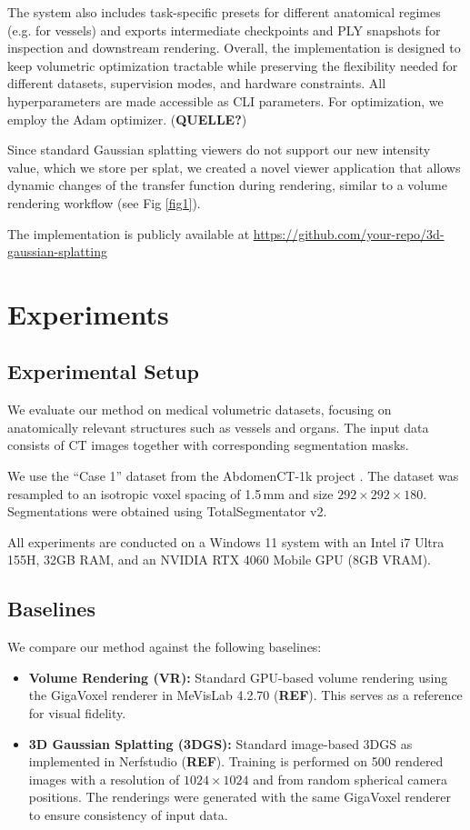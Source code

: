 \documentclass[runningheads]{llncs}
\begin{document}
The system also includes task-specific presets for different anatomical regimes (e.g. for vessels) and exports intermediate checkpoints and PLY snapshots for inspection and downstream rendering. Overall, the implementation is designed to keep volumetric optimization tractable while preserving the flexibility needed for different datasets, supervision modes, and hardware constraints. All hyperparameters are made accessible as CLI parameters. For optimization, we employ the Adam optimizer. (\textbf{QUELLE?})

Since standard Gaussian splatting viewers do not support our new intensity value, which we store per splat, we created a novel viewer application that allows dynamic changes of the transfer function during rendering, similar to a volume rendering workflow (see Fig \ref{fig1}).

The implementation is publicly available at \url{https://github.com/your-repo/3d-gaussian-splatting}



\section{Experiments}

\subsection{Experimental Setup}
We evaluate our method on medical volumetric datasets, focusing on anatomically relevant structures such as vessels and organs. The input data consists of CT images together with corresponding segmentation masks.

We use the ``Case 1'' dataset from the AbdomenCT-1k project \cite{ma2021abdomenct}. The dataset was resampled to an isotropic voxel spacing of 1.5\,mm and size $292 \times 292 \times 180$. Segmentations were obtained using TotalSegmentator v2.

All experiments are conducted on a Windows 11 system with an Intel i7 Ultra 155H, 32GB RAM, and an NVIDIA RTX 4060 Mobile GPU (8GB VRAM).

\subsection{Baselines}
We compare our method against the following baselines:

\begin{itemize}
\item \textbf{Volume Rendering (VR):} Standard GPU-based volume rendering using the GigaVoxel renderer in MeVisLab 4.2.70 (\textbf{REF}). This serves as a reference for visual fidelity.

\item \textbf{3D Gaussian Splatting (3DGS):} Standard image-based 3DGS as implemented in Nerfstudio (\textbf{REF}). Training is performed on 500 rendered images with a resolution of $1024 \times 1024$ and from random spherical camera positions. The renderings were generated with the same GigaVoxel renderer to ensure consistency of input data.
\end{itemize}
\end{document}
